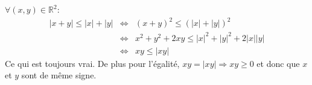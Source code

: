 $\forall(x,y)\in\mathbb{R}^2$:
\begin{eqnarray}
  |x+y|\leq |x|+|y| &\Leftrightarrow& (x+y)^2\leq \left(|x|+|y|\right)^2 \nonumber \\
  &\Leftrightarrow& x^2+y^2 + 2xy\leq |x|^2+|y|^2 + 2|x||y| \nonumber \\
  &\Leftrightarrow& xy\leq |xy| \nonumber 
\end{eqnarray}
Ce qui est toujours vrai. De plus pour l'égalité, $xy=|xy| \Rightarrow xy\geq0$ et donc que $x$ et $y$ sont de même signe.
